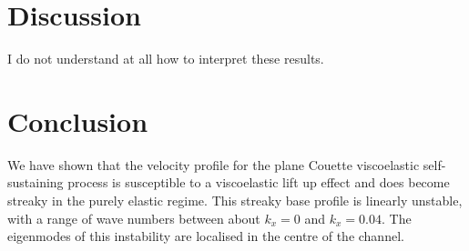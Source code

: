 \documentclass{jfm}
\begin{document}
\section{Discussion}\label{sec:discussion}

I do not understand at all how to interpret these results.

\section{Conclusion}\label{sec:conclusion}

We have shown that the velocity profile for the plane Couette viscoelastic self-sustaining process is susceptible to a viscoelastic lift up effect and does become streaky in the purely elastic regime. This streaky base profile is linearly unstable, with a range of wave numbers between about $k_x = 0$ and $k_x = 0.04$. The eigenmodes of this instability are localised in the centre of the channel.




\end{document}
